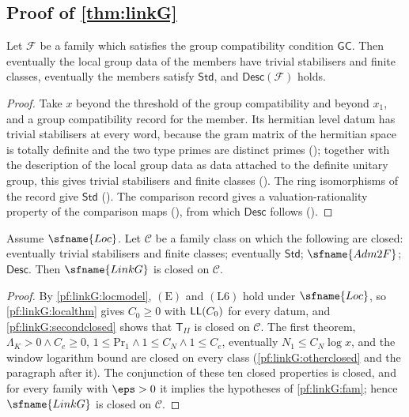 \subsection{Proof of \texorpdfstring{\cref{thm:linkG}}{the local lattice link}}\label{sec:pf:linkG:proof}

\begin{lemma}\label{pf:linkG:groupcompat}
Let $\mathcal F$ be a family which satisfies the group compatibility condition
$\mathsf{GC}$. Then eventually the local group data
of the members have trivial stabilisers and finite classes, eventually the members satisfy $\mathsf{Std}$, and
$\mathsf{Desc}(\mathcal F)$ holds.
\end{lemma}

\begin{proof}
Take $x$ beyond the threshold of the group compatibility and beyond $x_1$, and a group compatibility record for the
member. Its hermitian level datum has trivial stabilisers at every word, because the gram matrix of the hermitian
space is totally definite and the two type primes are distinct primes
(); together with the description of the local group data as data attached
to the definite unitary group, this gives trivial stabilisers and finite classes
(). The ring isomorphisms of the record give $\mathsf{Std}$
(). The comparison record gives a valuation-rationality property of the
comparison maps (), from which $\mathsf{Desc}$ follows
().
\end{proof}

\begin{theorem}\label{pf:linkG:tenclosed}
Assume $\sfname{Loc}$. Let $\mathcal C$ be a family class on which the following are closed: eventually trivial
stabilisers and finite classes; eventually $\mathsf{Std}$; $\sfname{Adm2F}$; $\mathsf{Desc}$. Then
$\sfname{LinkG}$ is closed on $\mathcal C$.
\end{theorem}

\begin{proof}
By \cref{pf:linkG:locmodel}, $(\mathrm E)$ and $(\mathrm L6)$ hold under $\sfname{Loc}$, so \cref{pf:linkG:localthm}
gives $C_0\ge0$ with $\mathsf{LL}(C_0)$ for every datum, and \cref{pf:linkG:secondclosed} shows that
$\mathsf T_{II}$ is closed on $\mathcal C$. The first theorem, $\Lambda_K>0\wedge C_e\ge0$,
$1\le\mathrm{Pr}_1\wedge1\le C_N\wedge1\le C_e$, eventually $N_1\le C_N\log x$, and the window logarithm bound are
closed on every class (\cref{pf:linkG:otherclosed} and the paragraph after it). The conjunction of these ten closed properties
is closed, and for every family with $\eps>0$ it implies the hypotheses of \cref{pf:linkG:fam}; hence $\sfname{LinkG}$ is
closed on $\mathcal C$.
\end{proof}

